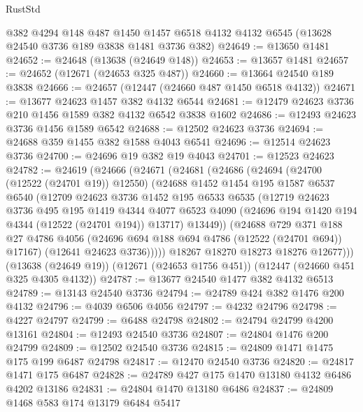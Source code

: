 \begin{lexlean}{RustStd}
\begin{coremodule}
    @382
    @4294
    @148
    @487
    @1450
    @1457
    @6518
    @4132
    @4132
    @6545
    (@13628 @24540 @3736 @189 @3838 @1481 @3736 @382)
@24649 := @13650 @1481
@24652 := @24648 (@13638 (@24649 @148))
@24653 := @13657 @1481
@24657 := @24652 (@12671 (@24653 @325 @487))
@24660 := @13664 @24540 @189 @3838
@24666 := @24657 (@12447 (@24660 @487 @1450 @6518 @4132))
@24671 := @13677 @24623 @1457 @382 @4132 @6544
@24681 := @12479 @24623 @3736 @210 @1456 @1589 @382 @4132 @6542 @3838 @1602
@24686 := @12493 @24623 @3736 @1456 @1589 @6542
@24688 := @12502 @24623 @3736
@24694 := @24688 @359 @1455 @382 @1588 @4043 @6541
@24696 := @12514 @24623 @3736
@24700 := @24696 @19 @382 @19 @4043
@24701 := @12523 @24623
@24782 := @24619
    (@24666
      (@24671
        (@24681
          (@24686
            (@24694
              (@24700 (@12522 (@24701 @19)) @12550)
              (@24688
                @1452
                @1454
                @195
                @1587
                @6537
                @6540
                (@12709
                  @24623
                  @3736
                  @1452
                  @195
                  @6533
                  @6535
                  (@12719
                    @24623
                    @3736
                    @495
                    @195
                    @1419
                    @4344
                    @4077
                    @6523
                    @4090
                    (@24696 @194 @1420 @194 @4344 (@12522 (@24701 @194)) @13717)
                    @13449))
                (@24688
                  @729
                  @371
                  @188
                  @27
                  @4786
                  @4056
                  (@24696 @694 @188 @694 @4786 (@12522 (@24701 @694)) @17167)
                  (@12641 @24623 @3736)))))
          @18267
          @18270
          @18273
          @18276
          @12677)))
    (@13638 (@24649 @19))
    (@12671 (@24653 @1756 @451))
    (@12447 (@24660 @451 @325 @4305 @4132))
@24787 := @13677 @24540 @1477 @382 @4132 @6513
@24789 := @13143 @24540 @3736
@24794 := @24789 @424 @382 @1476 @200 @4132
@24796 := @4039 @6506 @4056
@24797 := @4232 @24796
@24798 := @4227 @24797
@24799 := @6488 @24798
@24802 := @24794 @24799 @4200 @13161
@24804 := @12493 @24540 @3736
@24807 := @24804 @1476 @200 @24799
@24809 := @12502 @24540 @3736
@24815 := @24809 @1471 @1475 @175 @199 @6487 @24798
@24817 := @12470 @24540 @3736
@24820 := @24817 @1471 @175 @6487
@24828 := @24789 @427 @175 @1470 @13180 @4132 @6486 @4202 @13186
@24831 := @24804 @1470 @13180 @6486
@24837 := @24809 @1468 @583 @174 @13179 @6484 @5417

\end{coremodule}
\end{lexlean}
